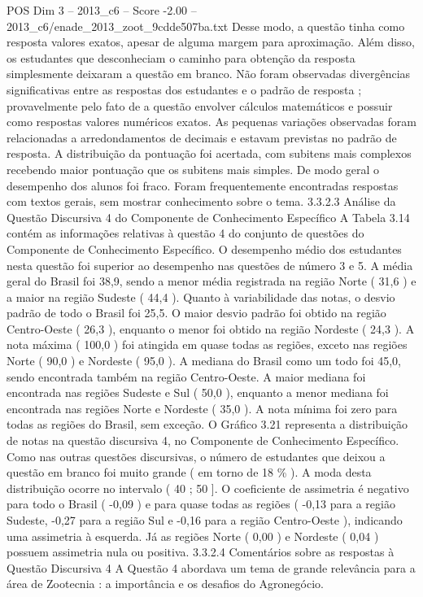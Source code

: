 \begin{textsample}{POS Dim 3 – 2013\_c6 – Score -2.00 – 2013\_c6/enade\_2013\_zoot\_9cdde507ba.txt}
Desse modo, a questão tinha como resposta valores exatos, apesar de alguma margem para aproximação.
Além disso, os estudantes que desconheciam o caminho para obtenção da resposta simplesmente deixaram a questão em branco.
Não foram observadas divergências significativas entre as respostas dos estudantes e o padrão de resposta ; provavelmente pelo fato de a questão envolver cálculos matemáticos e possuir como respostas valores numéricos exatos.
As pequenas variações observadas foram relacionadas a arredondamentos de decimais e estavam previstas no padrão de resposta.
A distribuição da pontuação foi acertada, com subitens mais complexos recebendo maior pontuação que os subitens mais simples.
De modo geral o desempenho dos alunos foi fraco.
Foram frequentemente encontradas respostas com textos gerais, sem mostrar conhecimento sobre o tema. 3.3.2.3 Análise da Questão Discursiva 4 do Componente de Conhecimento Específico A Tabela 3.14 contém as informações relativas à questão 4 do conjunto de questões do Componente de Conhecimento Específico.
O desempenho médio dos estudantes nesta questão foi superior ao desempenho nas questões de número 3 e 5.
A média geral do Brasil foi 38,9, sendo a menor média registrada na região Norte ( 31,6 ) e a maior na região Sudeste ( 44,4 ).
Quanto à variabilidade das notas, o desvio padrão de todo o Brasil foi 25,5.
O maior desvio padrão foi obtido na região Centro-Oeste ( 26,3 ), enquanto o menor foi obtido na região Nordeste ( 24,3 ).
A nota máxima ( 100,0 ) foi atingida em quase todas as regiões, exceto nas regiões Norte ( 90,0 ) e Nordeste ( 95,0 ).
A mediana do Brasil como um todo foi 45,0, sendo encontrada também na região Centro-Oeste.
A maior mediana foi encontrada nas regiões Sudeste e Sul ( 50,0 ), enquanto a menor mediana foi encontrada nas regiões Norte e Nordeste ( 35,0 ).
A nota mínima foi zero para todas as regiões do Brasil, sem exceção.
O Gráfico 3.21 representa a distribuição de notas na questão discursiva 4, no Componente de Conhecimento Específico.
Como nas outras questões discursivas, o número de estudantes que deixou a questão em branco foi muito grande ( em torno de 18 \% ).
A moda desta distribuição ocorre no intervalo ( 40 ; 50 ].
O coeficiente de assimetria é negativo para todo o Brasil ( -0,09 ) e para quase todas as regiões ( -0,13 para a região Sudeste, -0,27 para a região Sul e -0,16 para a região Centro-Oeste ), indicando uma assimetria à esquerda.
Já as regiões Norte ( 0,00 ) e Nordeste ( 0,04 ) possuem assimetria nula ou positiva. 3.3.2.4 Comentários sobre as respostas à Questão Discursiva 4 A Questão 4 abordava um tema de grande relevância para a área de Zootecnia : a importância e os desafios do Agronegócio.

\end{textsample}
